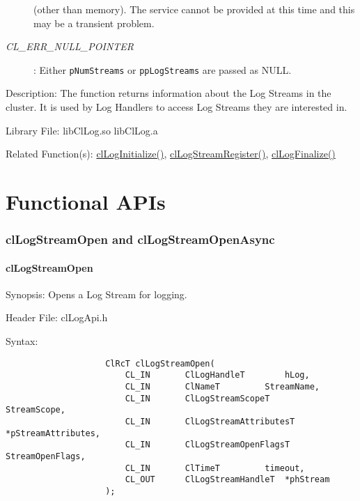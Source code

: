 \begin{flushleft}
\begin{Desc}
\begin{description}
(other than memory). The service cannot be provided at this time and this may be a transient problem.
\item[{\em CL\_\-ERR\_\-NULL\_\-POINTER}]: Either {\tt{pNumStreams}} or {\tt{ppLogStreams}} are passed as NULL.
\end{description}
\end{Desc}
\begin{Desc}
\item[Description:] The function returns information about the Log Streams in the cluster. It is used by Log Handlers to access Log Streams 
they are interested in.
\end{Desc}
\begin{Desc}
\item[Library File:] libClLog.so
\newline
libClLog.a\end{Desc}
\begin{Desc}
\item[Related Function(s):]\hyperlink{pagelog101}{clLogInitialize()}, \hyperlink{pagelog112}{clLogStreamRegister()}, 
\hyperlink{pagelog102}{clLogFinalize()}\end{Desc}
\newpage





\section{Functional APIs}
\subsubsection{clLogStreamOpen and clLogStreamOpenAsync}
\hypertarget{pagelog106}{}\paragraph{cl\-Log\-Stream\-Open}\label{pagelog106}
\begin{Desc}
\item[Synopsis:] Opens a Log Stream for logging.  \end{Desc}
\begin{Desc}
\item[Header File:] clLogApi.h \end{Desc}
\begin{Desc}
\item[Syntax:]
\footnotesize\begin{verbatim}        	
					ClRcT clLogStreamOpen(
						CL_IN		ClLogHandleT		hLog,
						CL_IN		ClNameT			StreamName,
						CL_IN 		ClLogStreamScopeT		StreamScope,
						CL_IN		ClLogStreamAttributesT	*pStreamAttributes,
						CL_IN		ClLogStreamOpenFlagsT	StreamOpenFlags,
						CL_IN		ClTimeT			timeout,
						CL_OUT		ClLogStreamHandleT	*phStream
					);
					

\end{verbatim}
\end{Desc}
\end{flushleft}
